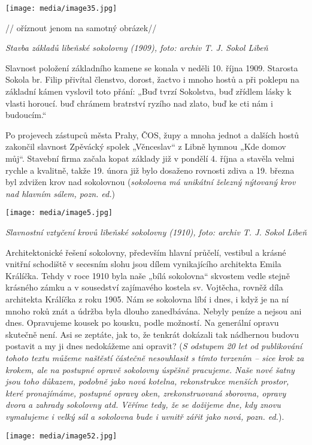\texttt{[image: media/image35.jpg]}

// oříznout jenom na samotný obrázek//

\emph{Stavba základů libeňské sokolovny (1909), foto: archiv T. J. Sokol
Libeň}

Slavnost položení základního kamene se konala v neděli 10. října 1909.
Starosta Sokola br. Filip přivítal členstvo, dorost, žactvo i mnoho
hostů a při poklepu na základní kámen vyslovil toto přání: „Buď tvrzí
Sokolstva, buď zřídlem lásky k vlasti horoucí. buď chrámem bratrství
ryzího nad zlato, buď ke cti nám i budoucím.``

Po projevech zástupců města Prahy, ČOS, župy a mnoha jednot a dalších
hostů zakončil slavnost Zpěvácký spolek „Věnceslav`` z Libně hymnou „Kde
domov můj``. Stavební firma začala kopat základy již v pondělí 4. října
a stavěla velmi rychle a kvalitně, takže 19. února již bylo dosaženo
rovnosti zdiva a 19. března byl zdvižen krov nad sokolovnou
(\emph{sokolovna má unikátní železný nýtovaný krov nad hlavním sálem,
pozn. ed.})

\texttt{[image: media/image5.jpg]}

\emph{Slavnostní vztyčení krovů libeňské sokolovny (1910), foto: archiv
T. J. Sokol Libeň}

Architektonické řešení sokolovny, především hlavní průčelí, vestibul a
krásné vnitřní schodiště v secesním slohu jsou dílem vynikajícího
architekta Emila Králíčka. Tehdy v roce 1910 byla naše „bílá sokolovna``
skvostem vedle stejně krásného zámku a v sousedství zajímavého kostela
sv. Vojtěcha, rovněž díla architekta Králíčka z roku 1905. Nám se
sokolovna líbí i dnes, i když je na ní mnoho roků znát a údržba byla
dlouho zanedbávána. Nebyly peníze a nejsou ani dnes. Opravujeme kousek
po kousku, podle možností. Na generální opravu skutečně není. Asi se
zeptáte, jak to, že tenkrát dokázali tak nádhernou budovu postavit a my
ji dnes nedokážeme ani opravit? (\emph{S odstupem 20 let od publikování
tohoto textu můžeme naštěstí částečně nesouhlasit s tímto tvrzením --
sice krok za krokem, ale na postupné opravě sokolovny úspěšně pracujeme.
Naše nové šatny jsou toho důkazem, podobně jako nová kotelna,
rekonstrukce menších prostor, které pronajímáme, postupné opravy oken,
zrekonstruovaná sborovna, opravy dvora a zahrady sokolovny atd. Věříme
tedy, že se dožijeme dne, kdy znovu vymalujeme i velký sál a sokolovna
bude i uvnitř zářit jako nová, pozn. ed.}).

\texttt{[image: media/image52.jpg]}

